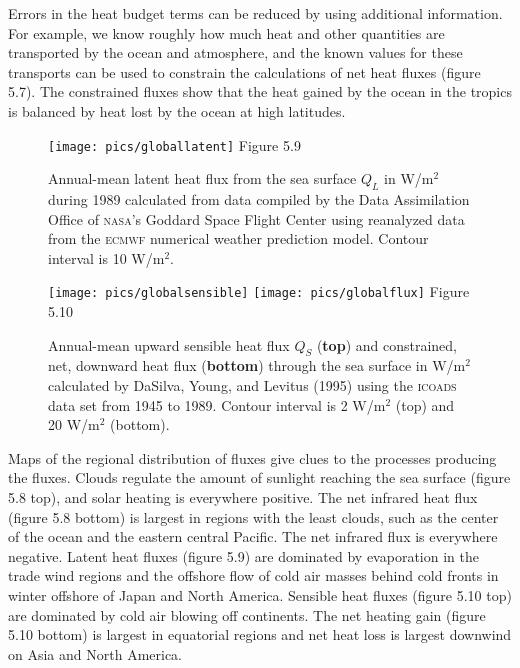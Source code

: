 Errors in the heat budget terms can be reduced by using additional
information. For example, we know roughly how much heat and other
quantities are transported by the ocean and
atmosphere, and the known values for these transports can be used to
constrain the calculations of net heat fluxes
(figure 5.7). The constrained fluxes show that the heat gained by the
ocean in the tropics is balanced by heat lost by the ocean at high
latitudes.

\begin{figure}[t!]
\texttt{[image: pics/globallatent]}
\footnotesize
Figure 5.9 \rule{0mm}{3ex}Annual-mean latent heat flux from the sea surface $Q_{L}$ in W/m$^2$ during
1989 calculated from data compiled by the Data Assimilation Office of \textsc{nasa}'s Goddard Space Flight Center
using reanalyzed data from the \textsc{ecmwf} numerical weather
prediction model. Contour interval is 10 W/m$^2$.
\label{fig:globallatent}
\vspace{-3ex}
\end{figure}

\begin{figure}[t!]
\texttt{[image: pics/globalsensible]}
\texttt{[image: pics/globalflux]}
\footnotesize
Figure 5.10 \rule{0mm}{3ex}Annual-mean upward sensible heat
flux $Q_{S}$ (\textbf{top})
and constrained, net, downward heat flux (\textbf{bottom}) through the
sea surface in W/m$^2$ calculated by DaSilva, Young, and Levitus
(1995) using the \textsc{icoads} data set from 1945 to 1989. Contour
interval is 2 W/m$^2$ (top) and 20 W/m$^2$ (bottom).
\label{fig:globalsensible}
\vspace{-5ex}
\end{figure}

Maps of the regional distribution of fluxes give clues to the
processes producing the fluxes. Clouds regulate the amount of sunlight
reaching the sea surface (figure 5.8 top), and solar heating is
everywhere positive.  The net infrared heat flux
(figure 5.8 bottom) is largest in regions with the least clouds, such
as the center of the ocean and the eastern central Pacific. The net
infrared flux is everywhere negative. Latent heat fluxes (figure 5.9)
are dominated by evaporation in the trade wind regions and the
offshore flow of cold air masses behind cold fronts in winter offshore
of Japan and North America.  Sensible heat fluxes (figure 5.10 top) are dominated by cold air blowing
off continents. The net heating gain (figure 5.10 bottom) is largest
in equatorial regions and net heat loss is largest downwind on Asia
and North America.

